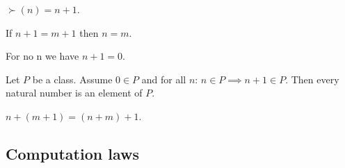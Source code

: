\documentclass[../../natural-numbers.ftl.tex]{subfiles}
\begin{document}
  \begin{forthel}
    \begin{lemma}
      $\succ(n) = n + 1$.
    \end{lemma}

    \begin{corollary}\label{Arithmetic_01_02_631603}
      If $n + 1 = m + 1$ then $n = m$.
    \end{corollary}

    \begin{corollary}\label{Arithmetic_01_02_329014}
      For no n we have $n + 1 = 0$.
    \end{corollary}

    \begin{corollary}\label{Arithmetic_01_02_253087}
      Let $P$ be a class.
      Assume $0 \in P$ and for all $n$: $n \in P \implies n + 1 \in P$.
      Then every natural number is an element of $P$.
    \end{corollary}

    \begin{corollary}\label{Arithmetic_01_02_117171}
      $n + (m + 1) = (n + m) + 1$.
    \end{corollary}
  \end{forthel}


  \subsection{Computation laws}
\end{document}
